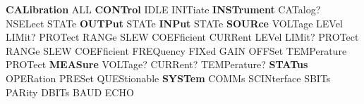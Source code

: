 


\begin{DoxyPre}
{\bfseries CALibration}
    ALL
{\bfseries CONTrol}
    IDLE
        INITiate
{\bfseries INSTrument}
    CATalog?
    NSELect
    STATe
{\bfseries OUTPut}
    STATe
{\bfseries INPut}
    STATe
{\bfseries SOURce}
    VOLTage
        LEVel
        LIMit?
        PROTect
        RANGe
        SLEW
        COEFficient
    CURRent
        LEVel
        LIMit?
        PROTect
        RANGe
        SLEW
        COEFficient
    FREQuency
        FIXed
        GAIN
        OFFSet
    TEMPerature
        PROTect
{\bfseries MEASure}
    VOLTage?
    CURRent?
    TEMPerature?
{\bfseries STATus}
    OPERation
    PRESet
    QUEStionable
{\bfseries SYSTem}
    COMMs
        SCINterface
            SBITs
            PARity
            DBITs
            BAUD
            ECHO
\end{DoxyPre}
 